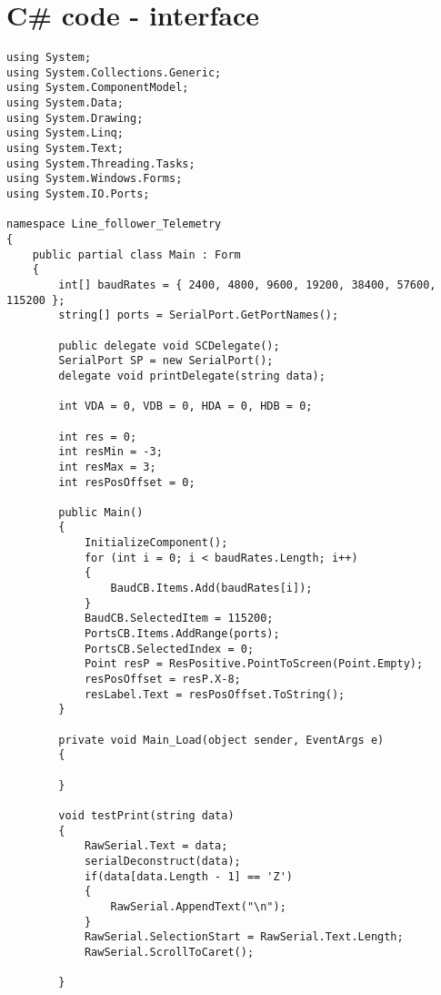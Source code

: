 \newpage
\section{C\# code - interface}
\lstset{language=[Sharp]C}
\begin{lstlisting}
using System;
using System.Collections.Generic;
using System.ComponentModel;
using System.Data;
using System.Drawing;
using System.Linq;
using System.Text;
using System.Threading.Tasks;
using System.Windows.Forms;
using System.IO.Ports;

namespace Line_follower_Telemetry
{
    public partial class Main : Form
    {
        int[] baudRates = { 2400, 4800, 9600, 19200, 38400, 57600, 115200 };
        string[] ports = SerialPort.GetPortNames();
        
        public delegate void SCDelegate();
        SerialPort SP = new SerialPort();
        delegate void printDelegate(string data);

        int VDA = 0, VDB = 0, HDA = 0, HDB = 0;

        int res = 0;
        int resMin = -3;
        int resMax = 3;
        int resPosOffset = 0;

        public Main()
        {
            InitializeComponent();
            for (int i = 0; i < baudRates.Length; i++)
            {
                BaudCB.Items.Add(baudRates[i]);
            }
            BaudCB.SelectedItem = 115200;
            PortsCB.Items.AddRange(ports);
            PortsCB.SelectedIndex = 0;
            Point resP = ResPositive.PointToScreen(Point.Empty);
            resPosOffset = resP.X-8;
            resLabel.Text = resPosOffset.ToString();
        }

        private void Main_Load(object sender, EventArgs e)
        {

        }

        void testPrint(string data)
        {
            RawSerial.Text = data;
            serialDeconstruct(data);
            if(data[data.Length - 1] == 'Z')
            {
                RawSerial.AppendText("\n");
            }
            RawSerial.SelectionStart = RawSerial.Text.Length;
            RawSerial.ScrollToCaret();
            
        }


\end{lstlisting}

